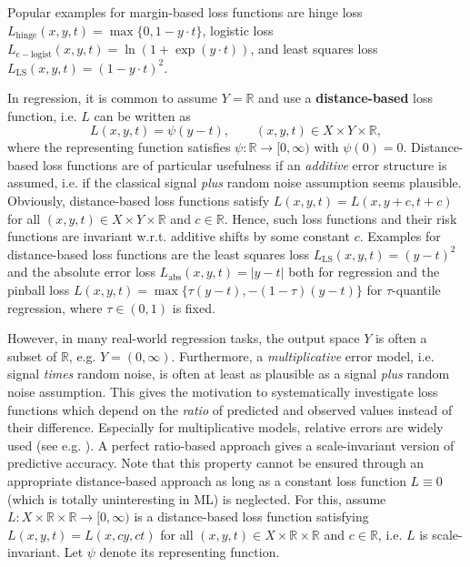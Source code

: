 \documentclass[10pt]{article}
\newcommand{\R}{\mathbb{R}}
\newcommand{\XY}{X \times Y}
\begin{document}
Popular examples for margin-based loss functions are hinge loss $L_{\mathrm{hinge}}(x,y,t)=\max\{0, 1-y\cdot t\}$, logistic loss $L_{\mathrm{c-logist}}(x,y,t)=\ln(1+\exp{(y\cdot t)})$, and least squares loss $L_{\mathrm{LS}}(x,y,t) = (1-y\cdot t)^2$.
\par
In regression, it is common to assume $Y = \R$ and use a \textbf{distance-based} loss function, i.e. $L$ can be written as 
\begin{equation*}
	L(x,y,t) = \psi(y-t),  \qquad  (x,y,t) \in \XY \times \R,
\end{equation*}
where the representing function satisfies $\psi: \R \to [0, \infty)$ with $\psi(0) = 0$.
Distance-based loss functions are of particular usefulness if an \emph{additive} error structure is assumed, i.e. if the classical signal \emph{plus} random noise assumption seems plausible. Obviously, distance-based loss functions satisfy $L(x,y,t) = L(x,y+c, t+c)$ for all $(x,y,t) \in \XY \times \R$ and $c \in \R$.
Hence, such loss functions and their risk functions are invariant w.r.t. additive shifts by some constant $c$.
Examples for distance-based loss functions are the least squares loss $L_{\mathrm{LS}}(x,y,t)=(y-t)^2$ and the absolute error loss $L_{\mathrm{abs}}(x,y,t)=|y-t|$ both for regression and the pinball loss $L(x,y,t)=\max\{\tau(y-t), -(1-\tau)(y-t)\}$ for $\tau$-quantile regression, where $\tau\in(0,1)$ is fixed. 
\par
However, in many real-world regression tasks, the output space $Y$ is often a subset of $\R$, e.g. $Y=(0,\infty)$.  
Furthermore, a \emph{multiplicative} error model, i.e. signal \emph{times} random noise, is often at least as plausible as a signal \emph{plus}  random noise assumption. 
This gives the motivation to systematically investigate loss functions which depend on the \emph{ratio} of predicted and observed values instead of their difference. 
Especially for multiplicative models, relative errors are widely used (see e.g. \cite{ChenEtAl2010LARE, ChenEtAl2016LPRE, ZhangEtAl2021}).
A perfect ratio-based approach gives a scale-invariant version of predictive accuracy.
Note that this property cannot be ensured through an appropriate distance-based approach as long as a constant loss function $L\equiv 0$ (which is totally uninteresting in ML) is neglected.
For this, assume $L: X \times \R \times \R \to [0, \infty)$ is a distance-based loss function satisfying $L(x,y,t) = L(x,c y, c t)$ for all $(x,y,t) \in X \times \R \times \R$ and $c \in \R$, i.e. $L$ is scale-invariant.
Let $\psi$ denote its representing function. 
\end{document}
